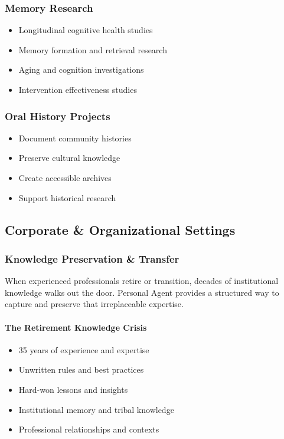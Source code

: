 \documentclass[11pt,letterpaper]{article}
\begin{document}
\subsubsection{Memory Research}
\begin{itemize}[leftmargin=*]
    \item Longitudinal cognitive health studies
    \item Memory formation and retrieval research
    \item Aging and cognition investigations
    \item Intervention effectiveness studies
\end{itemize}

\subsubsection{Oral History Projects}
\begin{itemize}[leftmargin=*]
    \item Document community histories
    \item Preserve cultural knowledge
    \item Create accessible archives
    \item Support historical research
\end{itemize}

\subsection{Corporate \& Organizational Settings}

\subsubsection{Knowledge Preservation \& Transfer}

When experienced professionals retire or transition, decades of institutional knowledge walks out the door. Personal Agent provides a structured way to capture and preserve that irreplaceable expertise.

\paragraph{The Retirement Knowledge Crisis}
\begin{itemize}[leftmargin=*]
    \item 35 years of experience and expertise
    \item Unwritten rules and best practices
    \item Hard-won lessons and insights
    \item Institutional memory and tribal knowledge
    \item Professional relationships and contexts
\end{itemize}
\end{document}
